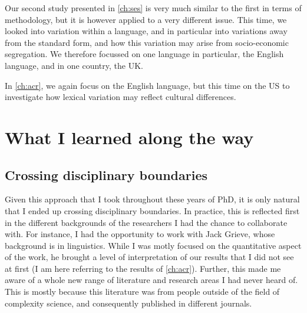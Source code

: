 \documentclass[../thesis.tex]{subfiles}
\begin{document}
Our second study presented in \cref{ch:ses} is very much similar to the first in terms
of methodology, but it is however applied to a very different issue. This time, we
looked into variation within a language, and in particular into variations away from the
standard form, and how this variation may arise from socio-economic segregation. We therefore focussed on one language in particular, the English language, and in one country, the UK. 

In \cref{ch:acr}, we again focus on the English language, but this time on the US to
investigate how lexical variation may reflect cultural differences. 



\section{What I learned along the way}



\subsection{Crossing disciplinary boundaries}
Given this approach that I took throughout these years of PhD, it is only natural that I
ended up crossing disciplinary boundaries. In practice, this is reflected first in the
different backgrounds of the researchers I had the chance to collaborate with. For
instance, I had the opportunity to work with Jack Grieve, whose background is in
linguistics. While I was motly focused on the quantitative aspect of the work, he
brought a level of interpretation of our results that I did not see at first (I am here
referring to the results of \cref{ch:acr}). Further, this made me aware of a whole new
range of literature and research areas I had never heard of. This is mostly because this
literature was from people outside of the field of complexity science, and consequently
published in different journals.
\end{document}
